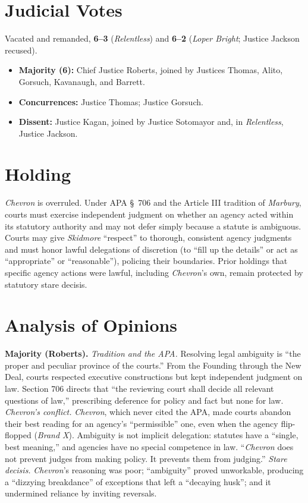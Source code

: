 \documentclass[12pt]{article}
\begin{document}
\section{Judicial Votes}

Vacated and remanded, \textbf{6--3} (\textit{Relentless}) and \textbf{6--2} (\textit{Loper Bright}; Justice Jackson recused).
\begin{itemize}
\item \textbf{Majority (6):} Chief Justice Roberts, joined by Justices Thomas, Alito, Gorsuch, Kavanaugh, and Barrett.
\item \textbf{Concurrences:} Justice Thomas; Justice Gorsuch.
\item \textbf{Dissent:} Justice Kagan, joined by Justice Sotomayor and, in \textit{Relentless}, Justice Jackson.
\end{itemize}

\section{Holding}

\textit{Chevron} is overruled. Under APA \S~706 and the Article III tradition of \textit{Marbury}, courts must exercise independent judgment on whether an agency acted within its statutory authority and may not defer simply because a statute is ambiguous. Courts may give \textit{Skidmore} ``respect'' to thorough, consistent agency judgments and must honor lawful delegations of discretion (to ``fill up the details'' or act as ``appropriate'' or ``reasonable''), policing their boundaries. Prior holdings that specific agency actions were lawful, including \textit{Chevron}'s own, remain protected by statutory stare decisis.

\section{Analysis of Opinions}

\textbf{Majority (Roberts).} \emph{Tradition and the APA.} Resolving legal ambiguity is ``the proper and peculiar province of the courts.'' From the Founding through the New Deal, courts respected executive constructions but kept independent judgment on law. Section 706 directs that ``the reviewing court shall decide all relevant questions of law,'' prescribing deference for policy and fact but none for law. \emph{\textit{Chevron}'s conflict.} \textit{Chevron}, which never cited the APA, made courts abandon their best reading for an agency's ``permissible'' one, even when the agency flip-flopped (\textit{Brand X}). Ambiguity is not implicit delegation: statutes have a ``single, best meaning,'' and agencies have no special competence in law. ``\textit{Chevron} does not prevent judges from making policy. It prevents them from judging.'' \emph{Stare decisis.} \textit{Chevron}'s reasoning was poor; ``ambiguity'' proved unworkable, producing a ``dizzying breakdance'' of exceptions that left a ``decaying husk''; and it undermined reliance by inviting reversals.
\end{document}
